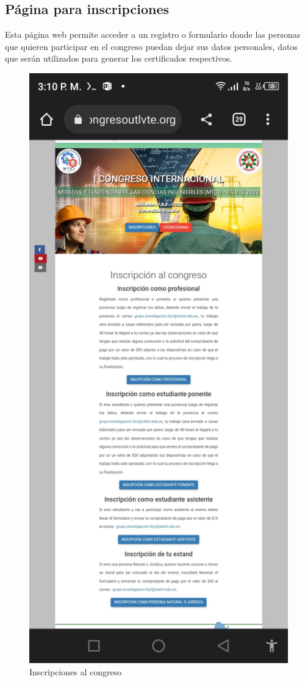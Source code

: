 \documentclass[a4paper,14px]{article}
\begin{document}
\newpage
\subsection{Página para inscripciones }
\label{sec:pagina-principal}

Esta página web permite acceder a un registro o formulario donde las personas que quieren participar en el congreso puedan dejar sus datos personales, datos que serán utilizados para generar los certificados respectivos.


\begin{minipage}[H]{0.45\linewidth}
  \begin{figure}[H]
    \centering
    \includegraphics[scale=0.25]{inscripcion.jpg}
    \caption{Inscripciones al congreso}
    \label{fig:arquitectura}
  \end{figure}
\end{minipage}
\end{document}
